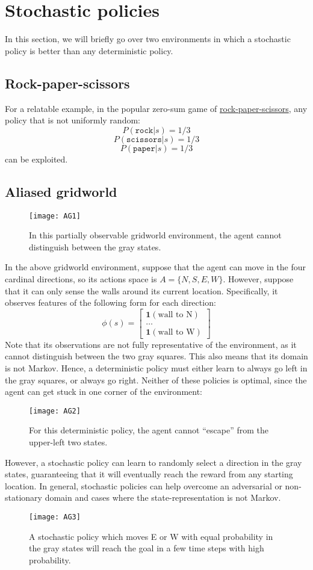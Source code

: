 \documentclass{article}
\begin{document}
\section{Stochastic policies}
In this section, we will briefly go over two environments in which a stochastic policy is better than any deterministic policy.
\subsection{Rock-paper-scissors}
For a relatable example, in the popular zero-sum game of \href{https://en.wikipedia.org/wiki/Rock-paper-scissors}{rock-paper-scissors}, any policy that is not uniformly random:
\[ P(\texttt{rock} | s) = 1/3 \]
\[ P(\texttt{scissors} | s) = 1/3 \]
\[ P(\texttt{paper} | s) = 1/3 \]
can be exploited.

\subsection{Aliased gridworld}
\begin{figure}[H]
    \centering
    \texttt{[image: AG1]}
    \caption{In this partially observable gridworld environment, the agent cannot distinguish between the gray states.}
\end{figure}
In the above gridworld environment, suppose that the agent can move in the four cardinal directions, so its actions space is $A = \{N, S, E, W\}$. However, suppose that it can only sense the walls around its current location. Specifically, it observes features of the following form for each direction:
$$
    \phi(s) = \begin{bmatrix}
        \mathbf{1}(\text{wall to N}) \\
        \dots \\
        \mathbf{1}(\text{wall to W})
    \end{bmatrix}
$$
Note that its observations are not fully representative of the environment, as it cannot distinguish between the two gray squares. This also means that its domain is not Markov. Hence, a deterministic policy must either learn to always go left in the gray squares, or always go right. Neither of these policies is optimal, since the agent can get stuck in one corner of the environment:
\begin{figure}[H]
    \centering
    \texttt{[image: AG2]}
    \caption{For this deterministic policy, the agent cannot ``escape'' from the upper-left two states.}
\end{figure}
However, a stochastic policy can learn to randomly select a direction in the gray states, guaranteeing that it will eventually reach the reward from any starting location. In general, stochastic policies can help overcome an adversarial or non-stationary domain and cases where the state-representation is not Markov.
\begin{figure}[H]
    \centering
    \texttt{[image: AG3]}
    \caption{A stochastic policy which moves E or W with equal probability in the gray states will reach the goal in a few time steps with high probability.}
\end{figure}
\end{document}
